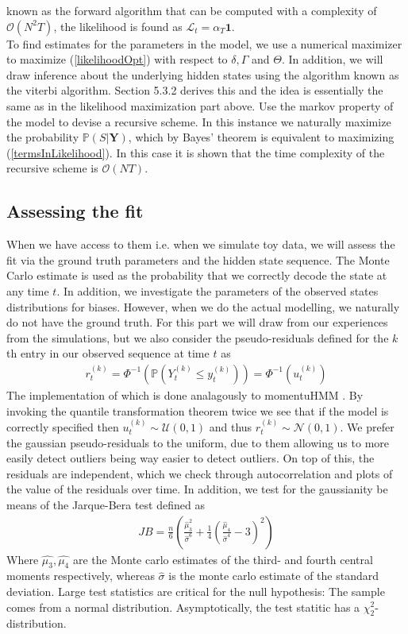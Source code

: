  known as the forward algorithm that can be computed with a complexity of $\mathcal{O}(N^2T)$, the likelihood is found as $\mathcal{L}_t = \alpha_T\mathbf{1}$.\\ To find estimates for the parameters in the model, we use a numerical maximizer to maximize (\ref{likelihoodOpt}) with respect to $\delta, \Gamma$ and $\Theta$. In addition, we will draw inference about the underlying hidden states using the algorithm known as the viterbi algorithm. Section 5.3.2 \cite{HHMForTimesSeries}  derives this and the idea is essentially the same as in the likelihood maximization part above. Use the markov property of the model to devise a recursive scheme. In this instance we naturally maximize the probability $\mathbb{P}(S | \mathbf{Y})$, which by Bayes' theorem is equivalent to maximizing (\ref{termsInLikelihood}). In this case it is shown that the time complexity of the recursive scheme is $\mathcal{O}(NT)$. \cite{HHMForTimesSeries}
\subsection{Assessing the fit}
When we have access to them i.e. when we simulate toy data, we will assess the fit via the ground truth parameters and the hidden state sequence. The Monte Carlo estimate is used as the probability that we correctly decode the state at any time $t$. In addition, we investigate the parameters of the observed states distributions for biases. However, when we do the actual modelling, we naturally do not have the ground truth. For this part we will draw from our experiences from the simulations, but we also consider the pseudo-residuals defined for the $k$th entry in our observed sequence at time $t$ as \cite{HHMForTimesSeries}
\begin{align}
    r_t^{(k)} = \Phi^{-1}\left(\mathbb{P}\left(Y_t^{(k)} \leq y_t^{(k)}\right)\right) = \Phi^{-1}\left(u_t^{(k)}\right) \label{pseudoresidualsFormula}
\end{align}
The implementation of which is done analagously to momentuHMM \cite{momentuHMM}.
By invoking the quantile transformation theorem twice we see that if the model is correctly specified then $u_t^{(k)}\sim \mathcal{U}(0,1)$ and thus $r_t^{(k)}\sim\mathcal{N}\left(0,1\right)$. We prefer the gaussian pseudo-residuals to the uniform, due to them allowing us to more easily detect outliers being way easier to detect outliers. On top of this, the residuals are independent, which we check through autocorrelation and plots of the value of the residuals over time. In addition, we test for the gaussianity be means of the Jarque-Bera test defined as
\begin{align}
    JB = \frac{n}{6}\left(\frac{\hat{\mu}_3^2}{\hat{\sigma}^6}+\frac{1}{4}\left(\frac{\hat{\mu}_4}{\hat{\sigma}^4}-3\right)^2\right)
\end{align}
Where $\hat{\mu_3}, \hat{\mu_4}$ are the Monte carlo estimates of the third- and fourth central moments respectively, whereas $\hat{\sigma}$ is the monte carlo estimate of the standard deviation. Large test statistics are critical for the null hypothesis: The sample comes from a normal distribution. Asymptotically, the test statitic has a $\chi_2^2$-distribution.\cite{tseries}
